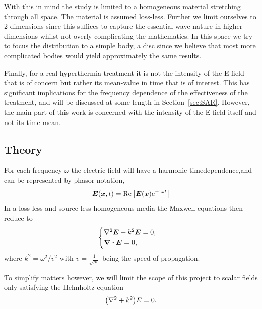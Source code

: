 \documentclass[11pt,a4paper, 
swedish,english %
]{article}
\begin{document}
With this in mind the study is limited to a homogeneous material stretching through all space. The material is assumed loss-less. %
Further we limit ourselves to 2 dimensions since this suffices to capture the essential wave nature in higher dimensions whilst not overly complicating the mathematics. 
In this space we try to focus the distribution to a simple body, a disc since we believe that most more complicated bodies would yield approximately the same results.


Finally, for a real hyperthermia treatment it is not the intensity of the E field that is of concern but rather its mean-value in time that is of interest. This has significant implications for the frequency dependence of the effectiveness of the treatment, and will be discussed at some length in Section~\ref{sec:SAR}. However, the main part of this work is concerned with the intensity of the E field itself and not its time mean.


\subsection{Theory}
For each frequency $\omega$ the electric field will have a harmonic timedependence,and can be represented by phasor notation,
\begin{equation}
  \label{eq:phasor}
\vb*E(\vb*x,t)=\Re\qty[\vb*E(\vb*x)\ee^{-\ii\omega t}]%
\end{equation}
In a loss-less and source-less homogeneous media the Maxwell equations then reduce to
\begin{equation}
\begin{cases}
\laplacian  \vb*E + k^2\vb*E=0,\\
\div\vb*E = 0,
\end{cases}
\end{equation} 
where $k^2 = \omega^2/v^2$ with $v=\frac{1}{\sqrt{\mu \epsilon}}$ being the speed of propagation. 

To simplify matters however, we will limit the scope of this project to scalar fields only satisfying the Helmholtz equation
\begin{equation}
  \label{eq:Helmholtz}
  \qty(\laplacian + k^2)E=0.
\end{equation} 
\end{document}
